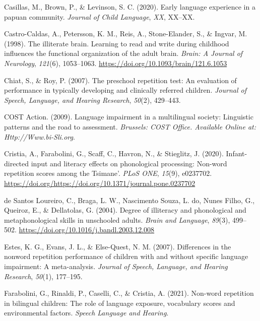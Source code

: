\documentclass[english,,man,floatsintext]{apa6}
\begin{document}
\leavevmode\hypertarget{ref-casillas2020early}{}%
Casillas, M., Brown, P., \& Levinson, S. C. (2020). Early language experience in a papuan community. \emph{Journal of Child Language}, \emph{XX}, XX--XX.

\leavevmode\hypertarget{ref-castro1998illiterate}{}%
Castro-Caldas, A., Petersson, K. M., Reis, A., Stone-Elander, S., \& Ingvar, M. (1998). The illiterate brain. Learning to read and write during childhood influences the functional organization of the adult brain. \emph{Brain: A Journal of Neurology}, \emph{121}(6), 1053--1063. \url{https://doi.org/10.1093/brain/121.6.1053}

\leavevmode\hypertarget{ref-chiat2007preschool}{}%
Chiat, S., \& Roy, P. (2007). The preschool repetition test: An evaluation of performance in typically developing and clinically referred children. \emph{Journal of Speech, Language, and Hearing Research}, \emph{50}(2), 429--443.

\leavevmode\hypertarget{ref-is08042009language}{}%
COST Action. (2009). Language impairment in a multilingual society: Linguistic patterns and the road to assessment. \emph{Brussels: COST Office. Available Online at: Http://Www.bi-Sli.org}.

\leavevmode\hypertarget{ref-cristia2020infant}{}%
Cristia, A., Farabolini, G., Scaff, C., Havron, N., \& Stieglitz, J. (2020). Infant-directed input and literacy effects on phonological processing: Non-word repetition scores among the Tsimane'. \emph{PLoS ONE}, \emph{15}(9), e0237702. \url{https://doi.org/https://doi.org/10.1371/journal.pone.0237702}

\leavevmode\hypertarget{ref-de2004degree}{}%
de Santos Loureiro, C., Braga, L. W., Nascimento Souza, L. do, Nunes Filho, G., Queiroz, E., \& Dellatolas, G. (2004). Degree of illiteracy and phonological and metaphonological skills in unschooled adults. \emph{Brain and Language}, \emph{89}(3), 499--502. \url{https://doi.org/10.1016/j.bandl.2003.12.008}

\leavevmode\hypertarget{ref-estes2007differences}{}%
Estes, K. G., Evans, J. L., \& Else-Quest, N. M. (2007). Differences in the nonword repetition performance of children with and without specific language impairment: A meta-analysis. \emph{Journal of Speech, Language, and Hearing Research}, \emph{50}(1), 177--195.

\leavevmode\hypertarget{ref-farabolini2021nonword}{}%
Farabolini, G., Rinaldi, P., Caselli, C., \& Cristia, A. (2021). Non-word repetition in bilingual children: The role of language exposure, vocabulary scores and environmental factors. \emph{Speech Language and Hearing}.
\end{document}
